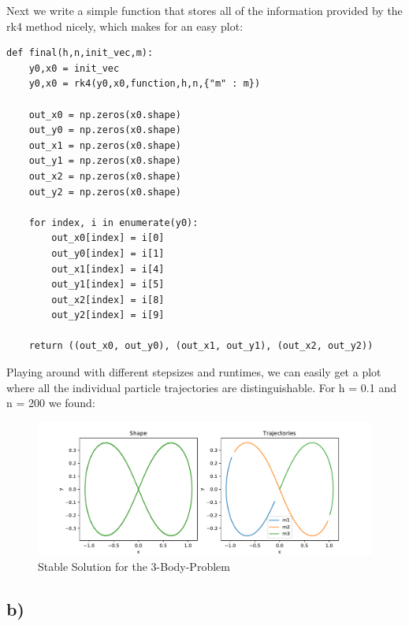\documentclass{article}
\begin{document}
Next we write a simple function that stores all of the information provided by
the rk4 method nicely, which makes for an easy plot:

\begin{lstlisting}
def final(h,n,init_vec,m):
    y0,x0 = init_vec
    y0,x0 = rk4(y0,x0,function,h,n,{"m" : m})

    out_x0 = np.zeros(x0.shape)
    out_y0 = np.zeros(x0.shape)
    out_x1 = np.zeros(x0.shape)
    out_y1 = np.zeros(x0.shape)
    out_x2 = np.zeros(x0.shape)
    out_y2 = np.zeros(x0.shape)

    for index, i in enumerate(y0):
        out_x0[index] = i[0]
        out_y0[index] = i[1]
        out_x1[index] = i[4]
        out_y1[index] = i[5]
        out_x2[index] = i[8]
        out_y2[index] = i[9]

    return ((out_x0, out_y0), (out_x1, out_y1), (out_x2, out_y2))
\end{lstlisting}

Playing around with different stepsizes and runtimes, we can easily get a
plot where all the individual particle trajectories are distinguishable.
For h = 0.1 and n = 200 we found:
\begin{figure}[ht]
    \centering
    \includegraphics[width=\textwidth]{fig2a.pdf} 
    \caption{Stable Solution for the 3-Body-Problem}
\end{figure}
 
\newpage
\subsection*{b)}
\end{document}
